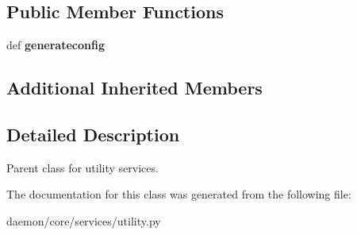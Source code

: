 \subsection*{Public Member Functions}
\begin{DoxyCompactItemize}
\item 
\hypertarget{classcore_1_1services_1_1utility_1_1_util_service_a6d67dad06a9c669003ce723dd6b2d6a2}{def {\bfseries generateconfig}}\label{classcore_1_1services_1_1utility_1_1_util_service_a6d67dad06a9c669003ce723dd6b2d6a2}

\end{DoxyCompactItemize}
\subsection*{Additional Inherited Members}


\subsection{Detailed Description}
\begin{DoxyVerb}Parent class for utility services.
\end{DoxyVerb}
 

The documentation for this class was generated from the following file\+:\begin{DoxyCompactItemize}
\item 
daemon/core/services/utility.\+py\end{DoxyCompactItemize}
